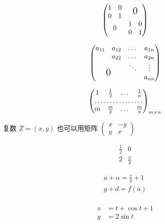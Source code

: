 \documentclass{ctexart}
\begin{document}
	\[
		\begin{pmatrix}
		\begin{matrix}
			1&0 \\
			0&1
		\end{matrix} & \text{\Large 0} \\
		0 & \begin{matrix}
			1&0 \\
			0&1
		\end{matrix}
		\end{pmatrix}
	\]
	
	\[
	\begin{pmatrix}
	a_{11} & a_{12} & \dots & a_{1n} \\
	&a_{22} & \dots & a_{2n} \\
	&  & \ddots & \vdots \\
	\multicolumn{2}{c}{\raisebox{1.3ex}[0 pt]{\Large 0}}	
	& &a_{nn}
	\end{pmatrix}
	\]
	
	\[
	\begin{pmatrix}
	1 & \frac{1}{2} & \dots & \frac{1}{n} \\
	\hdotsfor{4} \\
	m & \frac{m}{2} & \dots & \frac{m}{n}
	\end{pmatrix}_{m \times n}
	\]
	
	复数 $Z=(x,y)$ 也可以用矩阵
	\begin{math}
		\left(
		\begin{smallmatrix}
		x& -y \\ y & x
		\end{smallmatrix} 
		\right) 
	\end{math}
	
	\[
	\begin{array}{r|r}
		\frac{1}{2} & 0 \\
		2 & \frac{x}{y}
	\end{array}
	\]
	
	\begin{gather}
		a+\alpha=\frac{s}{y}+1 \\
		g+d=f(a)\\
	\end{gather}
	
	\begin{align}
		x&=t+\cos t + 1 \\
		y&=2\sin t
	\end{align}
	
\end{document}
